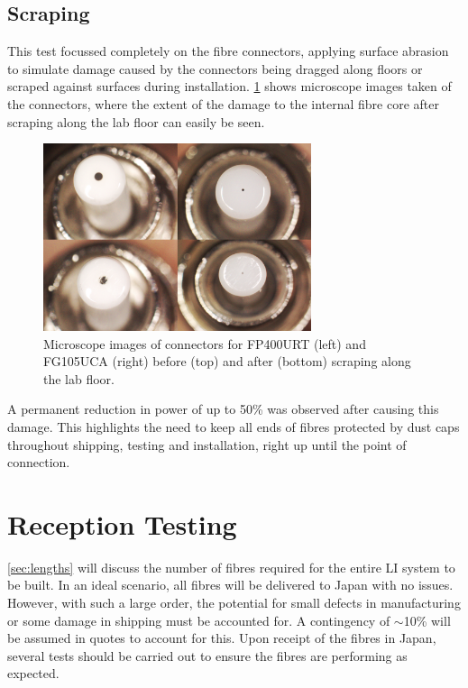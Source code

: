 \documentclass[a4paper,11pt]{article}
\let\oldsim\sim
\renewcommand{\sim}{{\oldsim}}
\begin{document}
\subsection{Scraping}
This test focussed completely on the fibre connectors, applying surface abrasion to simulate damage caused by the connectors being dragged along floors or scraped against surfaces during installation. \cref{fig:scraping} shows microscope images taken of the connectors, where the extent of the damage to the internal fibre core after scraping along the lab floor can easily be seen.
\begin{figure}[h]
\centering
\includegraphics[width=0.7\textwidth]{scraping}
\caption{Microscope images of connectors for FP400URT (left) and FG105UCA (right) before (top) and after (bottom) scraping along the lab floor.}\label{fig:scraping}
\end{figure}
A permanent reduction in power of up to 50\% was observed after causing this damage. This highlights the need to keep all ends of fibres protected by dust caps throughout shipping, testing and installation, right up until the point of connection.


\section{Reception Testing}\label{sec:testing}
\cref{sec:lengths} will discuss the number of fibres required for the entire LI system to be built. In an ideal scenario, all fibres will be delivered to Japan with no issues. However, with such a large order, the potential for small defects in manufacturing or some damage in shipping must be accounted for. A contingency of $\sim$10\% will be assumed in quotes to account for this. Upon receipt of the fibres in Japan, several tests should be carried out to ensure the fibres are performing as expected.
\end{document}
